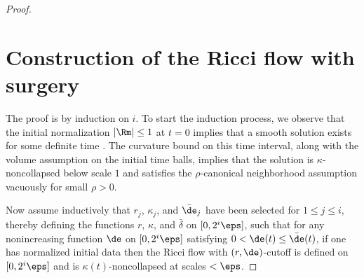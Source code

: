 \begin{proof}


\section{Construction of the Ricci flow with surgery}  \label{surgeryflow}

The proof is by induction on $i$.
To start the induction process,
we observe that
the initial normalization
$|\Rm|\leq 1$ at $t=0$
implies that a smooth solution exists for some definite time
\cite[Corollary 7.7]{Chow-Knopf}.
The curvature bound on this time interval, along with the
volume assumption on the initial time balls,
implies that the solution is $\kappa$-noncollapsed below  scale $1$
and satisfies the  $\rho$-canonical neighborhood assumption
vacuously for small $\rho>0$.

Now assume inductively that $r_j$, $\kappa_j$, and $\bar\de_j$
have been selected for $1\leq j\leq i$, thereby defining
the functions $r$, $\kappa$, and $\bar\delta$
on $[0, 2^i\eps]$, such that for
any nonincreasing function $\de$ on $[0,2^i\eps]$ satisfying
$0<\de(t)\leq \bar\de(t)$, if one has normalized
initial data then the Ricci flow with $(r,\de)$-cutoff
is defined on $[0,2^i\eps]$ and is $\kappa(t)$-noncollapsed at
scales $<\eps$.


\end{proof}
